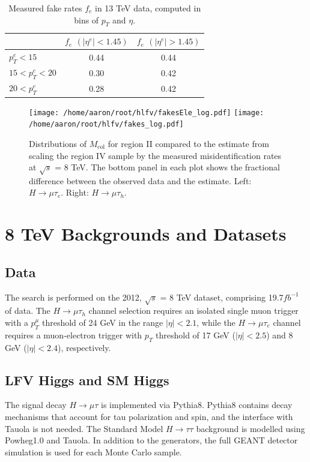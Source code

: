 \documentclass[oneside, letterpaper, oldfontcommands]{memoir}
\begin{document}
\begin{table}[htbp]
  \centering
  \begin{tabular}{ | l | c | c |}
    \hline
     & $f_{e}$ $\left(|\eta^{e}|<1.45\right)$ & $f_{e}$ $\left(|\eta^{e}|>1.45\right)$ \\ \hline \hline
    $p_{T}^{e} < 15$ & 0.44 & 0.44 \\ \hline
    $15< p_{T}^{e} < 20$& 0.30 & 0.42 \\ \hline
    $20< p_{T}^{e}$    & 0.28 & 0.42 \\ \hline

  \end{tabular}
  \caption{Measured fake rates $f_{e}$ in 13 TeV data, computed in bins of $p_{T}$ and $\eta$.}
  \label{tab:efakerate13TeV}
\end{table}


\begin{figure}[hbtp]\centering
\texttt{[image: /home/aaron/root/hlfv/fakesEle\_log.pdf]}
\texttt{[image: /home/aaron/root/hlfv/fakes\_log.pdf]}
\caption{Distributions of $M_\text{col}$ for region II compared to the estimate
from scaling the region IV sample by the measured misidentification rates at $\sqrt{s}$ = 8 TeV. The bottom panel in each plot shows the fractional difference between the observed data and the estimate. Left:  $H \rightarrow \mu \tau_{e}$. Right: $H \rightarrow \mu \tau_{h}$. }
\label{fig:samesign_fakes}\end{figure}


\section{8 TeV Backgrounds and Datasets}
\subsection{Data}
\qquad The search is performed on the 2012, $\sqrt{s}$ = 8 TeV dataset, comprising 19.7$fb^{-1}$ of data. The $H \rightarrow \mu\tau_{h}$ channel selection requires an isolated single muon trigger with a $p_{T}^{\mu}$ threshold of 24 GeV in the range $|\eta| < 2.1$, while the $H \rightarrow \mu\tau_{e}$ channel requires a muon-electron trigger with $p_{T}$ threshold of 17 GeV ($|\eta| < 2.5$) and 8 GeV ($|\eta| < 2.4$), respectively. 
\subsection{LFV Higgs and SM Higgs}
\qquad The signal decay $H \rightarrow \mu\tau$ is implemented via {\sc Pythia}8\cite{Sjostrand:2014zea}. {\sc Pythia}8 contains decay mechanisms that account for tau polarization and spin, and the interface with {\sc Tauola}\cite{Was:2011tv} is not needed\cite{Sjostrand:2014zea}. The Standard Model $H \rightarrow \tau\tau$ background is modelled using {\sc Powheg}1.0\cite{Frixione:2007nu} and {\sc Tauola}. In addition to the generators, the full GEANT detector simulation is used for each Monte Carlo sample.
\end{document}

